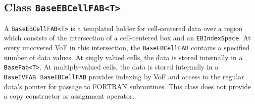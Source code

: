 \subsection{Class {\tt BaseEBCellFAB<T>}}
\label{sec::baseebcellfab}

A {\tt BaseEBCellFAB<T>} is a templated holder for cell-centered 
data over a region
which consists of the intersection
of a cell-centered box and an {\tt EBIndexSpace}.  At every uncovered VoF in this 
intersection, the {\tt BaseEBCellFAB} contains a specified number of
data values. 
At singly valued cells,
the data is stored internally in a \verb/BaseFab<T>/.  At multiply-valued
cells, the data is stored internally in a  {\tt BaseIVFAB}.
{\tt BaseEBCellFAB} provides indexing by VoF and access to the regular
data's pointer for passage to FORTRAN subroutines.
This class does not provide a copy constructor or assignment operator.  

